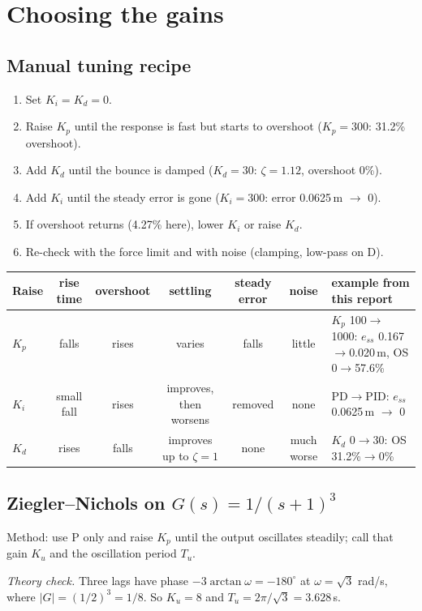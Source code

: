 \documentclass[10pt,a4paper]{article}
\begin{document}
\section{Choosing the gains}
\subsection{Manual tuning recipe}
\begin{enumerate}
\item Set $K_i=K_d=0$.
\item Raise $K_p$ until the response is fast but starts to overshoot ($K_p=300$: 31.2\% overshoot).
\item Add $K_d$ until the bounce is damped ($K_d=30$: $\zeta=1.12$, overshoot 0\%).
\item Add $K_i$ until the steady error is gone ($K_i=300$: error 0.0625\,m $\to$ 0).
\item If overshoot returns (4.27\% here), lower $K_i$ or raise $K_d$.
\item Re-check with the force limit and with noise (clamping, low-pass on D).
\end{enumerate}
\begin{center}\small
\begin{tabularx}{\linewidth}{@{}l c c c c c X@{}}
\toprule Raise & rise time & overshoot & settling & steady error & noise & example from this report\\\midrule
$K_p$ & falls & rises & varies & falls & little & $K_p$ 100$\to$1000: $e_{ss}$ 0.167$\to$0.020\,m, OS 0$\to$57.6\%\\
$K_i$ & small fall & rises & improves, then worsens & removed & none & PD$\to$PID: $e_{ss}$ 0.0625\,m $\to$ 0\\
$K_d$ & rises & falls & improves up to $\zeta=1$ & none & much worse & $K_d$ 0$\to$30: OS 31.2\%$\to$0\%\\\bottomrule\end{tabularx}\end{center}

\subsection{Ziegler--Nichols on $G(s)=1/(s+1)^3$}
Method: use P only and raise $K_p$ until the output oscillates steadily; call that gain $K_u$ and the oscillation period $T_u$.

\emph{Theory check.} Three lags have phase $-3\arctan\omega=-180^\circ$ at $\omega=\sqrt3$ rad/s, where $|G|=(1/2)^3=1/8$. So $K_u=8$ and $T_u=2\pi/\sqrt3=3.628$\,s.
\end{document}
